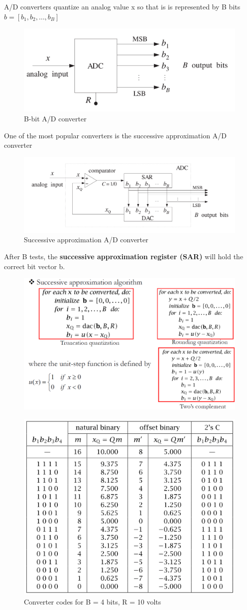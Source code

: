 \documentclass[11pt, a4paper]{article}
\begin{document}
A/D converters quantize an analog value x so that is is represented by B bits  $b=[b_1, b_2,…,b_B]$
\begin{figure}[h!]
    \centering
    \includegraphics[width=0.4\linewidth]{img/21.png}
    \caption{B-bit A/D converter}
\end{figure}
\newpage
One of the most popular converters is the successive approximation A/D converter
\begin{figure}[h!]
    \centering
    \includegraphics[width=0.5\linewidth]{img/22.png}
    \caption{Successive approximation A/D converter}
\end{figure}

After B tests, the \textbf{successive approximation register (SAR)} will hold the correct bit vector b.

\begin{figure}[h!]
    \centering
    \includegraphics[width=0.5\linewidth]{img/23.png}
\end{figure}
\begin{figure}[h!]
    \centering
    \includegraphics[width=0.5\linewidth]{img/28.png}
    \caption{Converter codes for B = 4 bits, R = 10 volts}
\end{figure}
\end{document}
